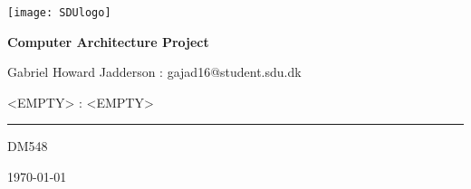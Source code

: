 \begin{titlepage}
	\centering
	\texttt{[image: SDUlogo]}\par\vspace{0.5cm} %
	{\huge\bfseries Computer Architecture Project\par}
	\vspace{0.5cm}
	{\small Gabriel Howard Jadderson : gajad16@student.sdu.dk\par}
	{\small <EMPTY> : <EMPTY>\par}
  {\rule{10.0cm}{0.1mm}\par}
	{\small DM548\par}
	{\small \today\par}
	\vspace{1cm}
\end{titlepage}

